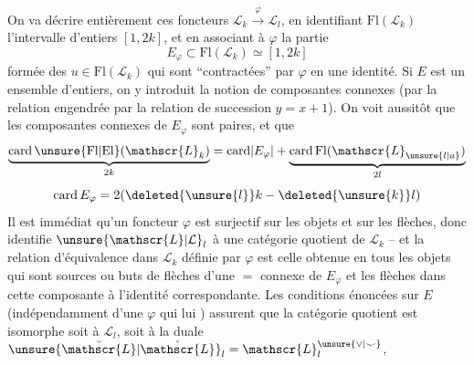 On va décrire entièrement ces foncteurs 
$\mathscr{L}_k\xrightarrow{\varphi}\mathscr{L}_l$, en identifiant $\mathrm{Fl}(\mathscr{L}_k)$  l'intervalle
d'entiers $[1,2k]$, et en associant à $\varphi$ la partie
\[
E_\varphi\subset\mathrm{Fl}(\mathscr{L}_k)\simeq[1,2k]
\]
formée des $u\in\mathrm{Fl}(\mathscr{L}_k)$  qui sont ``contractées''
par $\varphi$ en une identité. Si $E$ est un ensemble
d'entiers, on y introduit la notion de composantes
connexes (par la relation  engendrée par la relation
de succession $y=x+1$). On voit aussitôt que
les composantes connexes de $E_\varphi$  sont paires, et
que
\[
\underbrace{\operatorname{card}\unsure{\mathrm{Fl}|\mathrm{El}}(\mathscr{L}_k)}_{2k}
=\operatorname{card}\lvert E_\varphi\rvert+\underbrace{\operatorname{card}\mathrm{Fl}(\mathscr{L}_{\unsure{l|a}})}_{2l}
\]
 
\[
\operatorname{card}E_\varphi=2(\deleted{\unsure{l}}k-\deleted{\unsure{k}}l)
\]
Il est immédiat qu'un foncteur $\varphi$ est surjectif
sur les objets et sur les flèches, donc identifie
$\unsure{\mathscr{L}|\mathcal{L}}_l$ à une catégorie quotient de $\mathscr{L}_k$ -- 
et la relation d'équivalence dans $\mathscr{L}_k$ définie
par $\varphi$ est celle obtenue en  
tous les objets qui sont sources ou buts de
flèches d'une $=$  connexe  de $E_\varphi$
\diagram{\begin{tikzcd}[ampersand replacement=\&,column sep=small]
\cdots \& {} \arrow[r,phantom] \& {} \arrow[l] \arrow[r] \& \bullet \& \bullet \arrow[l] \arrow[r] \& \bullet \& {} \arrow[l] \arrow[r] \& {} \& \cdots
\arrow[from=1-3,to=1-7,phantom,"{\underbrace{\hspace{6em}}_{I}}"']
\end{tikzcd}}
et les flèches dans cette composante à l'identité correspondante. Les conditions énoncées sur $E$
(indépendamment d'une $\varphi$ qui lui 
) assurent que la catégorie quotient
est isomorphe 
soit à $\mathscr{L}_l$, soit à la duale $\unsure{\breve{\mathscr{L}}|\check{\mathscr{L}}}_l=\mathscr{L}_l^{\unsure{\vee|\smile}}$,

